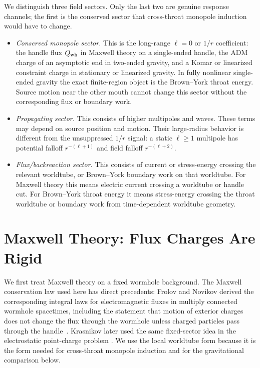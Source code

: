 \documentclass[aps,prd,10pt,onecolumn,nofootinbib,superscriptaddress,floatfix]{revtex4-2}
\begin{document}
We distinguish three field sectors.  Only the last two are genuine response
channels; the first is the conserved sector that cross-throat monopole
induction would have to change.
\begin{itemize}
\item \emph{Conserved monopole sector.}  This is the long-range $\ell=0$ or
$1/r$ coefficient: the handle flux $Q_{\rm wh}$ in Maxwell theory on a
single-ended handle, the ADM charge of an asymptotic end in two-ended gravity,
and a Komar or linearized constraint charge in stationary or linearized
gravity.  In fully nonlinear single-ended gravity the exact finite-region
object is the Brown--York throat energy.  Source motion near the other mouth
cannot change this sector without the corresponding flux or boundary work.
\item \emph{Propagating sector.}  This consists of higher multipoles and waves.
These terms may depend on source position and motion.  Their large-radius behavior is
different from the unsuppressed $1/r$ signal: a static $\ell\ge1$ multipole has
potential falloff $r^{-(\ell+1)}$ and field falloff $r^{-(\ell+2)}$.
\item \emph{Flux/backreaction sector.}  This consists of current or
stress-energy crossing the relevant worldtube, or Brown--York boundary work on
that worldtube.  For Maxwell theory this means electric current crossing a
worldtube or handle cut.  For Brown--York throat energy it means stress-energy
crossing the throat worldtube or boundary work from time-dependent worldtube
geometry.
\end{itemize}

\section{Maxwell Theory: Flux Charges Are Rigid}
\label{sec:maxwell}

We first treat Maxwell theory on a fixed wormhole background.  The Maxwell
conservation law used here has direct precedents: Frolov and Novikov derived the
corresponding integral laws for electromagnetic fluxes in multiply connected
wormhole spacetimes, including the statement that motion of exterior charges
does not change the flux through the wormhole unless charged particles pass
through the handle~\cite{FrolovNovikov1990PhysicalEffects}.  Krasnikov later
used the same fixed-sector idea in the electrostatic point-charge problem
\cite{Krasnikov2008ElectrostaticInteraction}.  We use the local worldtube form
because it is the form needed for cross-throat monopole induction and for the
gravitational comparison below.
\end{document}
